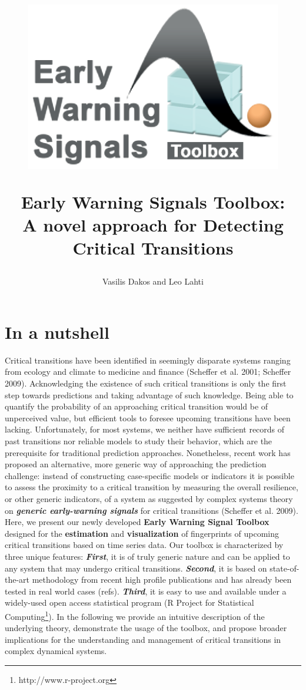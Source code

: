 \documentclass[12pt,a4paper,final]{article}
\author{Vasilis Dakos and Leo Lahti}
\title{
\begin{figure}[h]
\includegraphics[scale=0.55]{logoEWS.eps}
\end{figure}
Early Warning Signals Toolbox:\\ 
A novel approach for Detecting Critical Transitions
}
\begin{document}
\maketitle

\section{In a nutshell} %

Critical transitions have been identified in seemingly disparate systems ranging from ecology and climate to medicine and finance (Scheffer et al. 2001; Scheffer 2009). %
Acknowledging the existence of such critical transitions is only the first step towards predictions and taking advantage of such knowledge. Being able to quantify the probability of an approaching critical transition would be of unperceived value, but efficient tools to foresee upcoming transitions have been lacking. Unfortunately, for most systems, we neither have sufficient records of past transitions nor reliable models to study their behavior, which are the prerequisite for traditional prediction approaches. Nonetheless, recent work has proposed an alternative, more generic way of approaching the prediction challenge: instead of constructing case-specific models or indicators it is possible to assess the proximity to a critical transition by measuring the overall resilience, or other generic indicators, of a system as suggested by complex systems theory on \textit{\textbf{generic early-warning signals}} for critical transitions (Scheffer et al. 2009).\\

Here, we present our newly developed \textbf{Early Warning Signal Toolbox} designed for the \textbf{estimation} and \textbf{visualization} of fingerprints of upcoming critical transitions based on time series data. Our toolbox is characterized by three unique features: \textit{\textbf{First}}, it is of truly generic nature and can be applied to any system that may undergo critical transitions. \textit{\textbf{Second}}, it is based on state-of-the-art methodology from recent high profile publications and has already been tested in real world cases (refs). \textit{\textbf{Third}}, it is easy to use and available under a widely-used open access statistical program (R Project for Statistical Computing\footnote{http://www.r-project.org}). In the following we provide an intuitive description of the underlying theory, demonstrate the usage of the toolbox, and propose broader implications for the understanding and management of critical transitions in complex dynamical systems.
\end{document}
